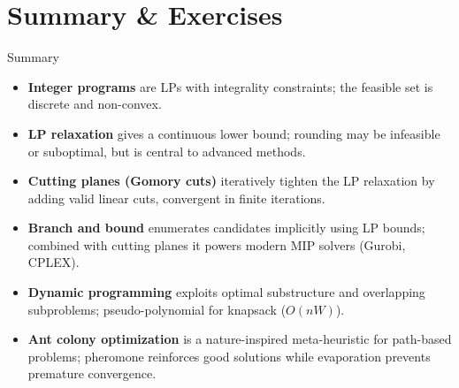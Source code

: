 \documentclass[aspectratio=169,10pt]{beamer}
\begin{document}
\section{Summary \& Exercises}

\begin{frame}{Summary}
  \begin{itemize}
    \item \textbf{Integer programs} are LPs with integrality constraints;
          the feasible set is discrete and non-convex.
    \item \textbf{LP relaxation} gives a continuous lower bound; rounding
          may be infeasible or suboptimal, but is central to advanced
          methods.
    \item \textbf{Cutting planes (Gomory cuts)} iteratively tighten the LP
          relaxation by adding valid linear cuts, convergent in finite
          iterations.
    \item \textbf{Branch and bound} enumerates candidates implicitly using
          LP bounds; combined with cutting planes it powers modern MIP
          solvers (Gurobi, CPLEX).
    \item \textbf{Dynamic programming} exploits optimal substructure and
          overlapping subproblems; pseudo-polynomial for knapsack
          ($O(nW)$).
    \item \textbf{Ant colony optimization} is a nature-inspired
          meta-heuristic for path-based problems; pheromone reinforces
          good solutions while evaporation prevents premature convergence.
  \end{itemize}
\end{frame}
\end{document}
